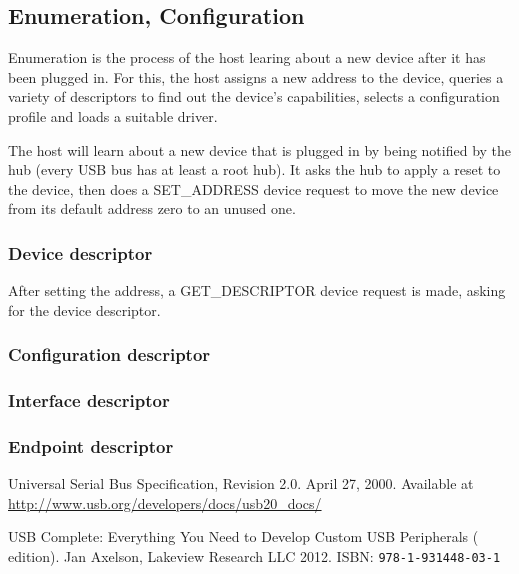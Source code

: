\documentclass{article}
\begin{document}
\subsection{Enumeration, Configuration}

Enumeration is the process of the host learing about a new device after it
has been plugged in. For this, the host assigns a new address to the device,
queries a variety of descriptors to find out the device's capabilities,
selects a configuration profile and loads a suitable driver.

The host will learn about a new device that is plugged in by being notified
by the hub (every USB bus has at least a root hub). It asks the hub to apply
a reset to the device, then does a SET\_ADDRESS device request to move the
new device from its default address zero to an unused one.

\subsubsection{Device descriptor}

After setting the address, a GET\_DESCRIPTOR
device request is made, asking for the device descriptor.

\subsubsection{Configuration descriptor}

\subsubsection{Interface descriptor}

\subsubsection{Endpoint descriptor}

\begin{thebibliography}{}

Universal Serial Bus Specification, Revision 2.0. April 27, 2000. Available at \url{http://www.usb.org/developers/docs/usb20_docs/}

USB Complete: Everything You Need to Develop Custom USB Peripherals ( edition).
Jan Axelson, Lakeview Research LLC 2012. ISBN: {\tt   978-1-931448-03-1}


\end{thebibliography}
\end{document}
